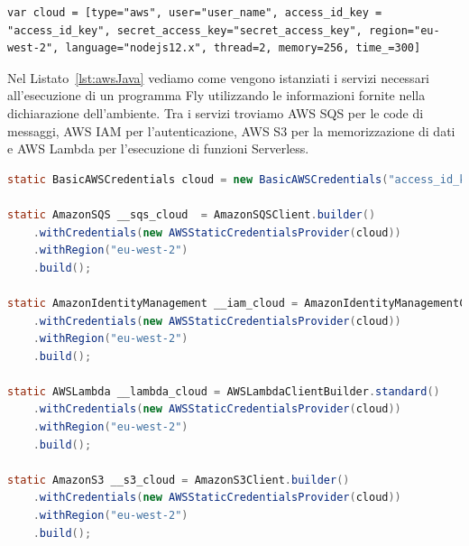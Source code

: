 \begin{lstlisting}[language=FLY,caption={Dichiarazione di un ambiente Cloud su AWS.}, label={lst:aws}]
var cloud = [type="aws", user="user_name", access_id_key = "access_id_key", secret_access_key="secret_access_key", region="eu-west-2", language="nodejs12.x", thread=2, memory=256, time_=300]
\end{lstlisting}

Nel Listato~\ref{lst:awsJava} vediamo come vengono istanziati i servizi necessari all'esecuzione di un programma Fly utilizzando le informazioni fornite nella dichiarazione dell'ambiente. Tra i servizi troviamo AWS SQS \cite{SQS} per le code di messaggi, AWS IAM \cite{IAM} per l'autenticazione, AWS S3 \cite{S3} per la memorizzazione di dati e AWS Lambda \cite{LambdaSite} per l'esecuzione di funzioni Serverless.\\

\begin{lstlisting}[language=Java,caption={Codice generato per l'ambiente Cloud su AWS.}, label={lst:awsJava}]
static BasicAWSCredentials cloud = new BasicAWSCredentials("access_id_key", "secret_access_key");
		
static AmazonSQS __sqs_cloud  = AmazonSQSClient.builder()
	.withCredentials(new AWSStaticCredentialsProvider(cloud))
	.withRegion("eu-west-2")
	.build();
		
static AmazonIdentityManagement __iam_cloud = AmazonIdentityManagementClientBuilder.standard()
	.withCredentials(new AWSStaticCredentialsProvider(cloud))
	.withRegion("eu-west-2")
	.build();
			
static AWSLambda __lambda_cloud = AWSLambdaClientBuilder.standard()
	.withCredentials(new AWSStaticCredentialsProvider(cloud))
	.withRegion("eu-west-2")
	.build();
			
static AmazonS3 __s3_cloud = AmazonS3Client.builder()
    .withCredentials(new AWSStaticCredentialsProvider(cloud))
    .withRegion("eu-west-2")
    .build();
\end{lstlisting}

